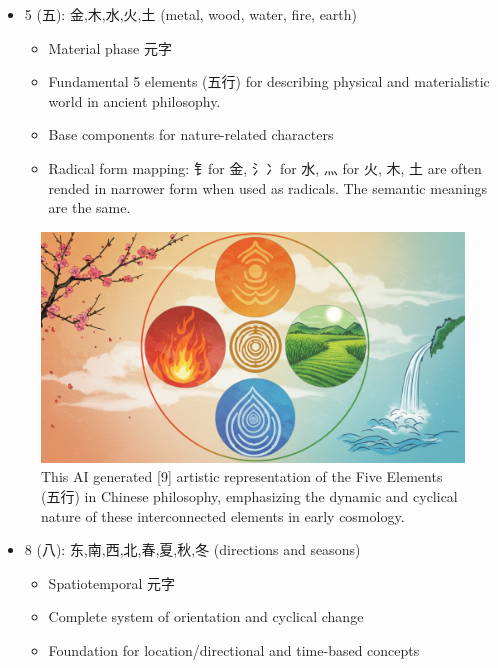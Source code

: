 \begin{itemize}
\tightlist
\item
  5 (五): 金,木,水,火,土 (metal, wood, water, fire, earth)

  \begin{itemize}
  \tightlist
  \item
    Material phase 元字
  \item
    Fundamental 5 elements (五行) for describing physical and
    materialistic world in ancient philosophy.
  \item
    Base components for nature-related characters
  \item
    Radical form mapping: 钅for 金, 氵冫for 水, 灬 for 火, 木, 土 are
    often rended in narrower form when used as radicals. The semantic
    meanings are the same.
  \end{itemize}
\end{itemize}

\begin{figure}
\centering
\includegraphics{./images/five-elements.jpg}
\caption{This AI generated {[}9{]} artistic representation of the Five
Elements (五行) in Chinese philosophy, emphasizing the dynamic and
cyclical nature of these interconnected elements in early cosmology.}
\end{figure}

\begin{itemize}
\tightlist
\item
  8 (八): 东,南,西,北,春,夏,秋,冬 (directions and seasons)

  \begin{itemize}
  \tightlist
  \item
    Spatiotemporal 元字
  \item
    Complete system of orientation and cyclical change
  \item
    Foundation for location/directional and time-based concepts
  \end{itemize}
\end{itemize}

